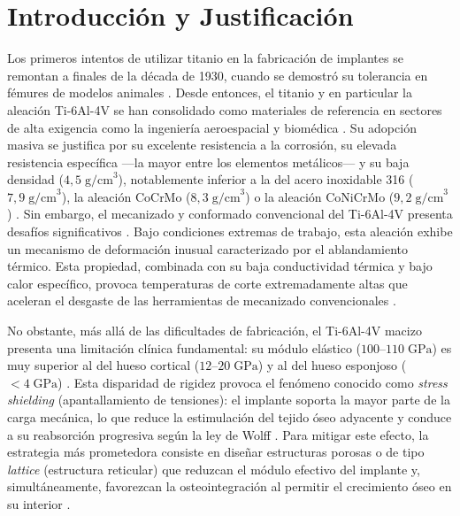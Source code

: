 \section{Introducción y Justificación}
\label{sec:introduccion}


Los primeros intentos de utilizar titanio en la fabricación de implantes se remontan a finales de la década de 1930, cuando se demostró su tolerancia en fémures de modelos animales \cite{park}. Desde entonces, el titanio y en particular la aleación Ti-6Al-4V se han consolidado como materiales de referencia en sectores de alta exigencia como la ingeniería aeroespacial y biomédica \cite{park,ratner,nguyen2022critical}. Su adopción masiva se justifica por su excelente resistencia a la corrosión, su elevada resistencia específica ---la mayor entre los elementos metálicos--- y su baja densidad ($4{,}5\;\text{g/cm}^3$), notablemente inferior a la del acero inoxidable 316 ($7{,}9\;\text{g/cm}^3$), la aleación CoCrMo ($8{,}3\;\text{g/cm}^3$) o la aleación CoNiCrMo ($9{,}2\;\text{g/cm}^3$) \cite{park}. Sin embargo, el mecanizado y conformado convencional del Ti-6Al-4V presenta desafíos significativos \cite{nguyen2022critical}. Bajo condiciones extremas de trabajo, esta aleación exhibe un mecanismo de deformación inusual caracterizado por el ablandamiento térmico. Esta propiedad, combinada con su baja conductividad térmica y bajo calor específico, provoca temperaturas de corte extremadamente altas que aceleran el desgaste de las herramientas de mecanizado convencionales \cite{nguyen2022critical}.

No obstante, más allá de las dificultades de fabricación, el Ti-6Al-4V macizo presenta una limitación clínica fundamental: su módulo elástico ($100$--$110\;\text{GPa}$) es muy superior al del hueso cortical ($12$--$20\;\text{GPa}$) y al del hueso esponjoso ($<4\;\text{GPa}$) \cite{park,ratner,misiaszek20243d}. Esta disparidad de rigidez provoca el fenómeno conocido como \textit{stress shielding} (apantallamiento de tensiones): el implante soporta la mayor parte de la carga mecánica, lo que reduce la estimulación del tejido óseo adyacente y conduce a su reabsorción progresiva según la ley de Wolff \cite{park,ratner}. Para mitigar este efecto, la estrategia más prometedora consiste en diseñar estructuras porosas o de tipo \textit{lattice} (estructura reticular) que reduzcan el módulo efectivo del implante y, simultáneamente, favorezcan la osteointegración al permitir el crecimiento óseo en su interior \cite{misiaszek20243d,li2024biomimetic,kilina2024influence}.

